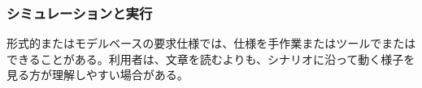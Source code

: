 \subsubsection{シミュレーションと実行}

形式的またはモデルベースの要求仕様では、仕様を手作業またはツールでまたはできることがある。利用者は、文章を読むよりも、シナリオに沿って動く様子を見る方が理解しやすい場合がある。
